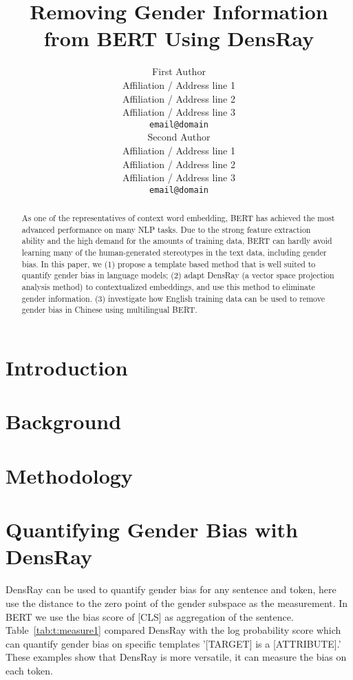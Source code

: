 \documentclass[11pt,a4paper]{article}
\title{Removing Gender Information from BERT Using DensRay}
\author{First Author \\
  Affiliation / Address line 1 \\
  Affiliation / Address line 2 \\
  Affiliation / Address line 3 \\
  \texttt{email@domain} \\\And
  Second Author \\
  Affiliation / Address line 1 \\
  Affiliation / Address line 2 \\
  Affiliation / Address line 3 \\
  \texttt{email@domain} \\}
\date{}
\def\tabref#1{Table~\ref{tab:#1}}
\begin{document}
\maketitle

\begin{abstract}
As one of the representatives of context word embedding, BERT has achieved the most advanced performance on many NLP tasks. Due to the strong feature extraction ability and the high demand for the amounts of training data, BERT can hardly avoid learning many of the human-generated stereotypes in the text data, including gender bias. In this paper, we (1) propose a template based method that is well suited to quantify gender bias in language models; (2) adapt DensRay (a vector space projection analysis method) to contextualized embeddings, and use this method to eliminate gender information. (3) investigate how English training data can be used to remove gender bias in Chinese using multilingual BERT.
\end{abstract}

\section{Introduction}


\section{Background}


\section{Methodology}


\section{Quantifying Gender Bias with DensRay}
DensRay can be used to quantify gender bias for any sentence and token, here use the distance to the zero point of the gender subspace as the measurement. In BERT we use the bias score of [CLS] as aggregation of the sentence. \tabref{t:measure1} compared DensRay with the log probability score \citep{kurita2019measuring} which can quantify gender bias on specific templates '[TARGET] is a [ATTRIBUTE].' These examples show that DensRay is more versatile, it can measure the bias on each token.
\end{document}
